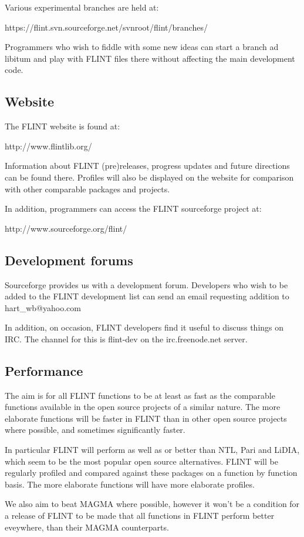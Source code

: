 \documentclass[a4paper,10pt]{article}
\begin{document}
Various experimental branches are held at:

https://flint.svn.sourceforge.net/svnroot/flint/branches/

Programmers who wish to fiddle with some new ideas can start a branch ad libitum and play with FLINT files there without affecting the main development code.

\subsection{Website}
The FLINT website is found at:

http://www.flintlib.org/

Information about FLINT (pre)releases, progress updates and future directions can be found there. Profiles will also be displayed on the website for comparison with other comparable packages and projects.

In addition, programmers can access the FLINT sourceforge project at:

http://www.sourceforge.org/flint/

\subsection{Development forums}
Sourceforge provides us with a development forum. Developers who wish to be added to the FLINT development list can send an email requesting addition to hart\_wb@yahoo.com

In addition, on occasion, FLINT developers find it useful to discuss things on IRC. The channel for this is flint-dev on the irc.freenode.net server. 

\subsection{Performance}
The aim is for all FLINT functions to be at least as fast as the comparable functions available in the open source projects of a similar nature. The more elaborate functions will be faster in FLINT than in other open source projects where possible, and sometimes significantly faster.

In particular FLINT will perform as well as or better than NTL, Pari and LiDIA, which seem to be the most popular open source alternatives. FLINT will be regularly profiled and compared against these packages on a function by function basis. The more elaborate functions will have more elaborate profiles.

We also aim to beat MAGMA where possible, however it won't be a condition for a release of FLINT to be made that all functions in FLINT perform better eveywhere, than their MAGMA counterparts. 
\end{document}
